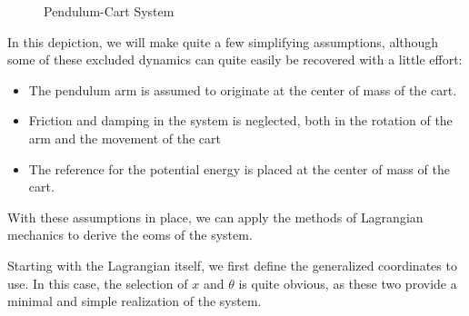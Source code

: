 \begin{figure}[ht]

    \caption{Pendulum-Cart System}
    \label{fig:Pendulum Cart}
\end{figure}
In this depiction, we will make quite a few simplifying assumptions, although some of these excluded dynamics can quite easily be recovered with a little effort:
\begin{itemize}
    \item The pendulum arm is assumed to originate at the center of mass of the cart.
    \item Friction and damping in the system is neglected, both in the rotation of the arm and the movement of the cart
    \item The reference for the potential energy is placed at the center of mass of the cart.
\end{itemize}

With these assumptions in place, we can apply the methods of \gls{Lagrangian} mechanics to derive the \glspl{eom} of the system. 

Starting with the \gls{Lagrangian} itself, we first define the generalized coordinates to use. In this case, the selection of $x$ and $\theta$ is quite obvious, as these two provide a minimal and simple realization of the system.

